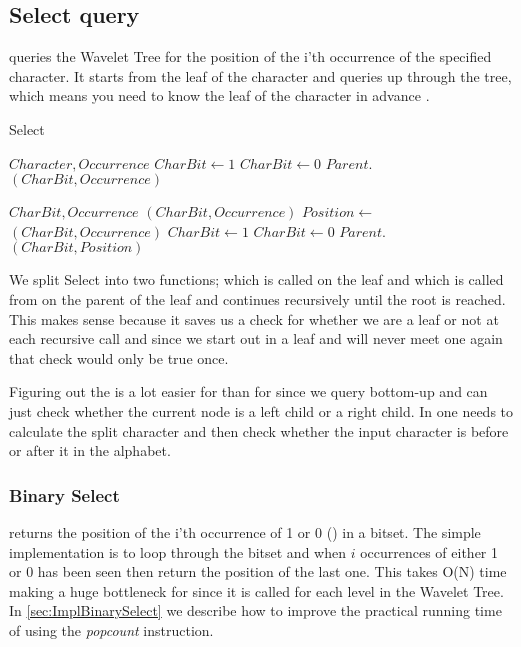 \subsection{Select query}
 queries the Wavelet Tree for the position of the i'th occurrence of the specified character.
It starts from the leaf of the character and queries up through the tree, which means you need to know the leaf of the character in advance \citep[Section 2.2]{Claude08practicalrankselect}. 


\begin{algorithm}
\caption{Select}
\label{alg:select}
\begin{algorithmic} 
 {$Character, Occurrence$}
	\State $CharBit \gets 1$
\Else
	\State $CharBit \gets 0$
\EndIf
\State \Return $Parent.$$(CharBit, Occurrence)$
\EndFunction

\vspace{1cm}

 {$CharBit, Occurrence$}
	\State \Return {}$(CharBit, Occurrence)$
\EndIf
\State $Position \gets $$(CharBit, Occurrence)$
	\State $CharBit \gets 1$
\Else
	\State $CharBit \gets 0$
\EndIf
\State \Return $Parent.$$(CharBit, Position)$
\EndFunction
\end{algorithmic}
\end{algorithm}


We split Select into two functions;  which is called on the leaf and  which is called from  on the parent of the leaf and continues recursively until the root is reached. 
This makes sense because it saves us a check for whether we are a leaf or not at each recursive call and since we start out in a leaf and will never meet one again that check would only be true once. 

Figuring out the  is a lot easier for  than for  since we query bottom-up and can just check whether the current node is a left child or a right child. 
In  one needs to calculate the split character and then check whether the input character is before or after it in the alphabet.

\subsubsection{Binary Select}
 returns the position of the i'th occurrence of 1 or 0 () in a bitset. 
The simple implementation is to loop through the bitset and when $i$ occurrences of either 1 or 0 has been seen then return the position of the last one. 
This takes O(N) time making  a huge bottleneck for  since it is called for each level in the Wavelet Tree. 
In \ref{sec:ImplBinarySelect} we describe how to improve the practical running time of  using the \textit{popcount} instruction.

